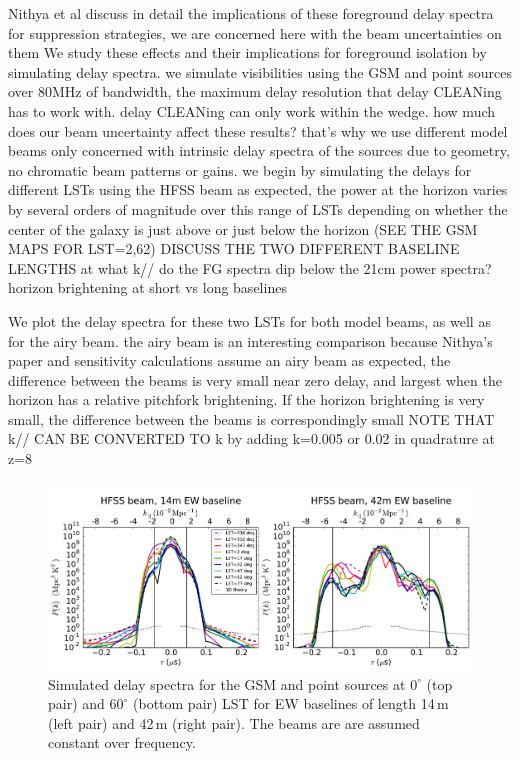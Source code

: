 \documentclass{emulateapj}
\begin{document}
Nithya et al discuss in detail the implications of these foreground delay spectra for suppression strategies, we are concerned here with the beam uncertainties on them
We study these effects and their implications for foreground isolation by simulating delay spectra.
we simulate visibilities using the GSM and point sources over 80MHz of bandwidth, the maximum delay resolution that delay CLEANing has to work with. delay CLEANing can only work within the wedge. 
how much does our beam uncertainty affect these results? that's why we use different model beams
only concerned with intrinsic delay spectra of the sources due to geometry, no chromatic beam patterns or gains. 
we begin by simulating the delays for different LSTs using the HFSS beam
as expected, the power at the horizon varies by several orders of magnitude over this range of LSTs depending on whether the center of the galaxy is just above or just below the horizon (SEE THE GSM MAPS FOR LST=2,62)
DISCUSS THE TWO DIFFERENT BASELINE LENGTHS
	at what k// do the FG spectra dip below the 21cm power spectra?
	horizon brightening at short vs long baselines

We plot the delay spectra for these two LSTs for both model beams, as well as for the airy beam. 
the airy beam is an interesting comparison because Nithya's paper and sensitivity calculations assume an airy beam
as expected, the difference between the beams is very small near zero delay, and largest when the horizon has a relative pitchfork brightening. If the horizon brightening is very small, the difference between the beams is correspondingly small
NOTE THAT k// CAN BE CONVERTED TO k by adding k=0.005 or 0.02 in quadrature at z=8


\begin{figure}[h]
\includegraphics[width=6.7in]{delay_spectra_dave_rich_airy_beams_manyLSTs.pdf}
\caption{Simulated delay spectra for the GSM and point sources at $0^\circ$ (top pair) and $60^\circ$ (bottom pair) LST for EW baselines of length 14\,m (left pair) and 42\,m (right pair). The beams are are assumed constant over frequency.}
\label{fig:delayspecmanyLSTs}
\end{figure}
\end{document}
